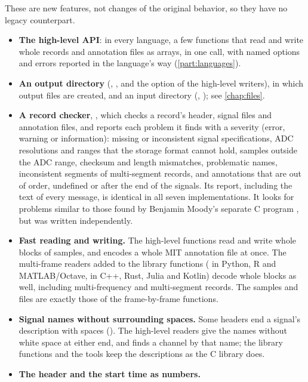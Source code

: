 These are new features, not changes of the original behavior, so they have
no legacy counterpart.
\begin{itemize}
\item \textbf{The high-level API}: in every language, a few functions that
  read and write whole records and annotation files as arrays, in one call,
  with named options and errors reported in the language's way
  (\cref{part:languages}).
\item \textbf{An output directory} (,
  , and the  option of the high-level
  writers), in which output files are created, and an input directory
  (, ); see
  \cref{chap:files}.
\item \textbf{A record checker}, ,
  which checks a record's header, signal files and annotation files, and
  reports each problem it finds with a severity (error, warning or
  information): missing or inconsistent signal specifications, ADC
  resolutions and ranges that the storage format cannot hold, samples outside
  the ADC range, checksum and length mismatches, problematic names,
  inconsistent segments of multi-segment records, and annotations that are
  out of order, undefined or after the end of the signals. Its report,
  including the text of every message, is identical in all seven
  implementations. It looks for problems similar to those found by Benjamin
  Moody's separate C program , but was written independently.
\item \textbf{Fast reading and writing.} The high-level functions read and
  write whole blocks of samples, and  encodes a whole
  MIT annotation file at once. The multi-frame readers added to the library
  functions ( in Python, R and MATLAB/Octave, 
  in C++, Rust, Julia and Kotlin) decode whole blocks as well, including
  multi-frequency and multi-segment records. The samples and files are
  exactly those of the frame-by-frame functions.
\item \textbf{Signal names without surrounding spaces.} Some headers end a
  signal's description with spaces (). The high-level readers
  give the names without white space at either end, and 
  finds a channel by that name; the library functions and the tools keep the
  descriptions as the C library does.
\item \textbf{The header and the start time as numbers.} 

\end{itemize}
